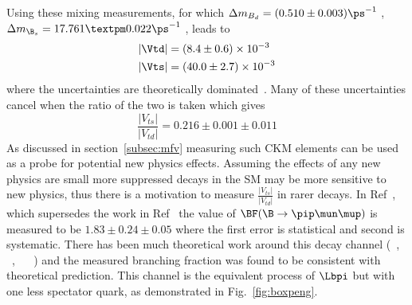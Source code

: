 Using these mixing measurements, for which $\Delta m_{B_{d}} = (0.510\pm0.003)\ps^{-1}$ \cite{pdg},  $\Delta m_{\B_{s}} = 17.761 ± 0.022\ps^{-1}$ \cite{bslhcb}, leads to
\begin{equation}
  \begin{split}
    & |\Vtd| = (8.4\pm0.6)\times 10^{-3}\\
    & |\Vts| = (40.0\pm2.7)\times 10^{-3}
  \end{split}
\end{equation}
where the uncertainties are theoretically dominated~\cite{pdg}. Many of these uncertainties cancel when the ratio of the two is taken which gives
\begin{equation}
  \frac{|V_{ts}|}{|V_{td}|} = 0.216\pm0.001\pm 0.011
  \label{eq:vtsvtd}
\end{equation}
As discussed in section~\ref{subsec:mfv} measuring such CKM elements can be used as a probe for potential new physics effects. Assuming the effects of any new physics are small more suppressed decays in the SM may be more sensitive to new physics, thus there is a motivation to measure $\frac{|V_{ts}|}{|V_{td}|}$ in rarer decays.
In Ref~\cite{pimumunew}, which supersedes the work in Ref~\cite{pimumuold} the value of $\BF(\B\to\pip\mun\mup)$ is measured to be $1.83\pm0.24\pm0.05$ where the first error is statistical and second is systematic. There has been much theoretical work around this decay channel (~\cite{bpipi_th_1}, ~\cite{bpipi_th_2}, ~\cite{bpipi_th_3} ~\cite{bpipi_th_4}) and the measured branching fraction was found to be consistent with theoretical prediction.  This channel is the equivalent process of $\Lbpi$ but with one less spectator quark, as demonstrated in Fig.~\ref{fig:boxpeng}.

